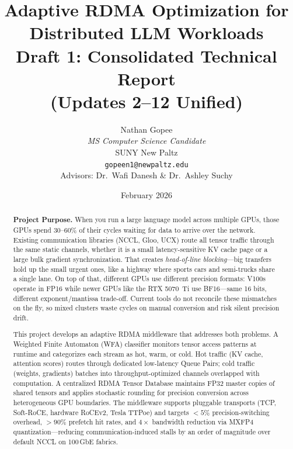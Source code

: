 \documentclass[11pt,letterpaper]{article}
\title{
    \vspace{-1cm}
    \textbf{Adaptive RDMA Optimization for Distributed LLM Workloads} \\[0.5em]
    \large Draft 1: Consolidated Technical Report\\
    \normalsize (Updates 2--12 Unified)
}
\author{
    Nathan Gopee \\
    \textit{MS Computer Science Candidate} \\
    SUNY New Paltz \\
    \texttt{gopeen1@newpaltz.edu} \\[1em]
    \small Advisors: Dr.\ Wafi Danesh \& Dr.\ Ashley Suchy
}
\date{February 2026}
\theoremstyle{definition}
\begin{document}
\maketitle

\begin{abstract}
\noindent
\textbf{Project Purpose.}
When you run a large language model across multiple GPUs, those GPUs spend 30--60\% of their cycles waiting for data to arrive over the network. Existing communication libraries (NCCL, Gloo, UCX) route all tensor traffic through the same static channels, whether it is a small latency-sensitive KV cache page or a large bulk gradient synchronization. That creates \emph{head-of-line blocking}---big transfers hold up the small urgent ones, like a highway where sports cars and semi-trucks share a single lane. On top of that, different GPUs use different precision formats: V100s operate in FP16 while newer GPUs like the RTX 5070~Ti use BF16---same 16 bits, different exponent/mantissa trade-off. Current tools do not reconcile these mismatches on the fly, so mixed clusters waste cycles on manual conversion and risk silent precision drift.

This project develops an adaptive RDMA middleware that addresses both problems. A Weighted Finite Automaton (WFA) classifier monitors tensor access patterns at runtime and categorizes each stream as hot, warm, or cold. Hot traffic (KV cache, attention scores) routes through dedicated low-latency Queue Pairs; cold traffic (weights, gradients) batches into throughput-optimized channels overlapped with computation. A centralized RDMA Tensor Database maintains FP32 master copies of shared tensors and applies stochastic rounding for precision conversion across heterogeneous GPU boundaries. The middleware supports pluggable transports (TCP, Soft-RoCE, hardware RoCEv2, Tesla TTPoe) and targets ${<}5$\% precision-switching overhead, ${>}90$\% prefetch hit rates, and $4\times$ bandwidth reduction via MXFP4 quantization---reducing communication-induced stalls by an order of magnitude over default NCCL on 100\,GbE fabrics.
\end{abstract}

\newpage
\tableofcontents
\newpage


\end{document}
